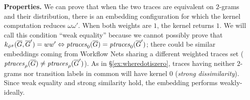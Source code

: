 
\noindent
\textbf{Properties.}\label{subsub:prop}
We can prove that when the two traces are equivalent on $2$-grams and their distribution,  there is an embedding configuration
for which the kernel computation reduces $\omega\omega'$. When both weights are $1$, the kernel returns $1$. We will call this
condition  ``weak equality'' because we cannot possibly prove that
$k_{\gorgembed}(\closed{\tg},\closed{\tg}')=ww'\Leftrightarrow \ptraces{\closed{\tg}}{0}=\ptraces{\closed{\tg}'}{0}$;
there could be similar embeddings coming from Workflow Nets sharing a different weighted traces set ($\ptraces{\closed{\tg}}{\pmin}\neq\ptraces{\closed{\tg}'}{\pmin}$). As in \S\ref{ex:wheredotiszero}, traces having neither $2$-grams nor transition labels in common will have kernel $0$ (\textit{strong dissimilarity}). Since weak equality and strong similarity hold, the embedding performs weakly-ideally.

